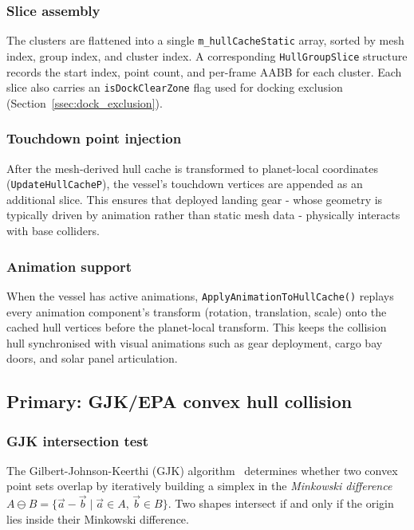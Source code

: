 \documentclass[Orbiter Technical Reference.tex]{subfiles}
\begin{document}
\subsubsection{Slice assembly}
The clusters are flattened into a single \texttt{m\_hullCacheStatic}
array, sorted by mesh index, group index, and cluster index.  A
corresponding \texttt{HullGroupSlice} structure records the start index,
point count, and per-frame AABB for each cluster.  Each slice also
carries an \texttt{isDockClearZone} flag used for docking exclusion
(Section~\ref{ssec:dock_exclusion}).

\subsubsection{Touchdown point injection}
After the mesh-derived hull cache is transformed to planet-local
coordinates (\texttt{UpdateHullCacheP}), the vessel's touchdown vertices
are appended as an additional slice.  This ensures that deployed landing
gear - whose geometry is typically driven by animation rather than
static mesh data - physically interacts with base
colliders.

\subsubsection{Animation support}
When the vessel has active animations,
\texttt{ApplyAnimationToHullCache()} replays every animation component's
transform (rotation, translation, scale) onto the cached hull vertices
before the planet-local transform.  This keeps the collision hull
synchronised with visual animations such as gear deployment, cargo bay
doors, and solar panel articulation.


\subsection{Primary: GJK/EPA convex hull collision}
\label{ssec:gjk_epa}

\subsubsection{GJK intersection test}
\label{ssec:gjk}
The Gilbert-Johnson-Keerthi (GJK) algorithm~\cite{gjk1988} determines
whether two convex point sets overlap by iteratively building a simplex
in the \emph{Minkowski difference} $A \ominus B = \{\vec{a} - \vec{b}
\mid \vec{a} \in A,\, \vec{b} \in B\}$.  Two shapes intersect if and
only if the origin lies inside their Minkowski difference.
\end{document}
